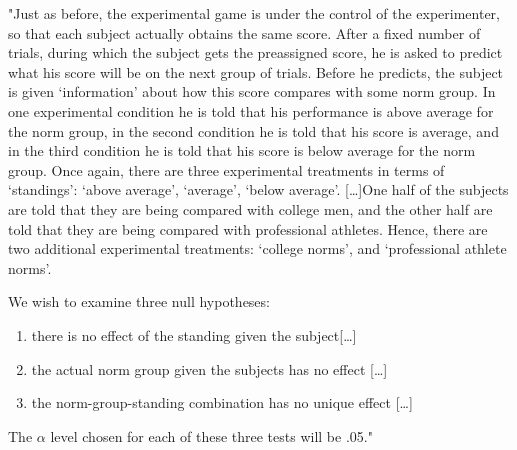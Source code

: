 \documentclass[
]{book}
\begin{document}
"Just as before, the experimental game is under the control of the experimenter, so that each subject actually obtains the same score. After a fixed number of trials, during which the subject gets the preassigned score, he is asked to predict what his score will be on the next group of trials. Before he predicts, the subject is given `information' about how this score compares with some norm group. In one experimental condition he is told that his performance is above average for the norm group, in the second condition he is told that his score is average, and in the third condition he is told that his score is below average for the norm group. Once again, there are three experimental treatments in terms of `standings': `above average', `average', `below average'. {[}\ldots{]}One half of the subjects are told that they are being compared with college men, and the other half are told that they are being compared with professional athletes. Hence, there are two additional experimental treatments: `college norms', and `professional athlete norms'.

We wish to examine three null hypotheses:

\begin{enumerate}
\def\labelenumi{(\arabic{enumi})}
\item
  there is no effect of the standing given the subject{[}\ldots{]}
\item
  the actual norm group given the subjects has no effect {[}\ldots{]}
\item
  the norm-group-standing combination has no unique effect {[}\ldots{]}
\end{enumerate}

The \(\alpha\) level chosen for each of these three tests will be .05."
\end{document}
